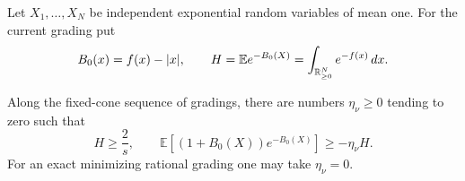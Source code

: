 Let $X_1,\ldots,X_N$ be independent exponential random variables of
mean one. For the current grading put
\begin{equation}\label{jet:moment-notation}
 B_0(x)=f(x)-|x|,\qquad
 H=\mathbb E e^{-B_0(X)}=\int_{\mathbb R_{\ge0}^N}e^{-f(x)}\,dx.
\end{equation}

\begin{lemma}\label{jet:moments}
Along the fixed-cone sequence of gradings, there are numbers
$\eta_\nu\ge0$ tending to zero such that
\begin{equation}\label{jet:moment-inequalities}
 H\ge\frac2s,\qquad
 \mathbb E[(1+B_0(X))e^{-B_0(X)}]\ge-\eta_\nu H.
\end{equation}
For an exact minimizing rational grading one may take $\eta_\nu=0$.
\end{lemma}

